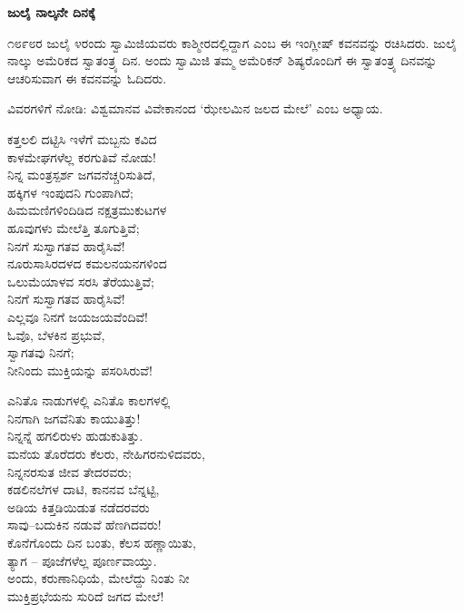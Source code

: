 \selectkan

\begin{center}
\textbf{ಜುಲೈ ನಾಲ್ಕನೇ ದಿನಕ್ಕೆ}
\end{center}

೧೮೯೮ರ ಜುಲೈ ೪ರಂದು ಸ್ವಾಮಿಜಿಯವರು ಕಾಶ್ಮೀರದಲ್ಲಿದ್ದಾಗ  ಎಂಬ ಈ ಇಂಗ್ಲೀಷ್ ಕವನವನ್ನು ರಚಿಸಿದರು. ಜುಲೈ ನಾಲ್ಕು ಅಮೆರಿಕದ ಸ್ವಾತಂತ್ರ್ಯ ದಿನ. ಅಂದು ಸ್ವಾಮಿಜಿ ತಮ್ಮ ಅಮೆರಿಕನ್ ಶಿಷ್ಯರೊಂದಿಗೆ ಈ ಸ್ವಾತಂತ್ರ್ಯ ದಿನವನ್ನು ಆಚರಿಸುವಾಗ ಈ ಕವನವನ್ನು ಓದಿದರು.

ವಿವರಗಳಿಗೆ ನೋಡಿ: ವಿಶ್ವಮಾನವ ವಿವೇಕಾನಂದ ‘ಝೇಲಮಿನ ಜಲದ ಮೇಲೆ’ ಎಂಬ ಅಧ್ಯಾಯ.

\begin{myquote}
ಕತ್ತಲಲಿ ದಟ್ಟಿಸಿ ಇಳೆಗೆ ಮಬ್ಬನು ಕವಿದ\\ಕಾಳಮೇಘಗಳೆಲ್ಲ ಕರಗುತಿವೆ ನೋಡು!\\ನಿನ್ನ ಮಂತ್ರಸ್ಪರ್ಶ ಜಗವನೆಚ್ಚರಿಸುತಿದೆ,\\ಹಕ್ಕಿಗಳ ಇಂಪುದನಿ ಗುಂಪಾಗಿದೆ;\\ಹಿಮಮಣಿಗಳಿಂದಿಡಿದ ನಕ್ಷತ್ರಮುಕುಟಗಳ\\ಹೂವುಗಳು ಮೇಲೆತ್ತಿ ತೂಗುತ್ತಿವೆ;\\ನಿನಗೆ ಸುಸ್ವಾಗತವ ಹಾರೈಸಿವೆ!\\ನೂರುಸಾಸಿರದಳದ ಕಮಲನಯನಗಳಿಂದ\\ಒಲುಮೆಯಾಳವ ಸರಸಿ ತೆರೆಯುತ್ತಿವೆ;\\ನಿನಗೆ ಸುಸ್ವಾಗತವ ಹಾರೈಸಿವೆ!\\ಎಲ್ಲವೂ ನಿನಗೆ ಜಯಜಯವೆಂದಿವೆ!\\ಓವೊ, ಬೆಳಕಿನ ಪ್ರಭುವೆ,\\ಸ್ವಾಗತವು ನಿನಗೆ;\\ನೀನಿಂದು ಮುಕ್ತಿಯನ್ನು ಪಸರಿಸಿರುವೆ!
\end{myquote}

\begin{myquote}
ಎನಿತೊ ನಾಡುಗಳಲ್ಲಿ ಎನಿತೊ ಕಾಲಗಳಲ್ಲಿ\\ನಿನಗಾಗಿ ಜಗವೆನಿತು ಕಾಯುತಿತ್ತು!\\ನಿನ್ನನ್ನೆ ಹಗಲಿರುಳು ಹುಡುಕುತಿತ್ತು.\\ಮನೆಯ ತೊರೆದರು ಕೆಲರು, ನೇಹಿಗರನುಳಿದವರು,\\ನಿನ್ನನರಸುತ ಜೀವ ತೇದರವರು;\\ಕಡಲಿನಲೆಗಳ ದಾಟಿ, ಕಾನನವ ಬೆನ್ನಟ್ಟಿ,\\ಅಡಿಯ ಕಿತ್ತಡಿಯಿಡುತ ನಡೆದರವರು\\ಸಾವು–ಬದುಕಿನ ನಡುವೆ ಹೆಣಗಿದವರು!\\ಕೊನೆಗೊಂದು ದಿನ ಬಂತು, ಕೆಲಸ ಹಣ್ಣಾಯಿತು,\\ತ್ಯಾಗ – ಪೂಜೆಗಳೆಲ್ಲ ಪೂರ್ಣವಾಯ್ತು.\\
ಅಂದು, ಕರುಣಾನಿಧಿಯೆ, ಮೇಲೆದ್ದು ನಿಂತು ನೀ\\ಮುಕ್ತಿಪ್ರಭೆಯನು ಸುರಿದೆ ಜಗದ ಮೇಲೆ!
\end{myquote}

